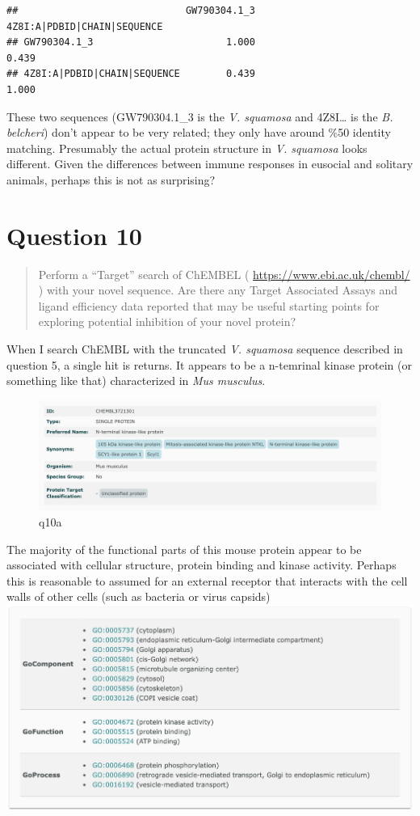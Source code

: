 \documentclass[]{article}
\begin{document}
\begin{verbatim}
##                             GW790304.1_3 4Z8I:A|PDBID|CHAIN|SEQUENCE
## GW790304.1_3                       1.000                       0.439
## 4Z8I:A|PDBID|CHAIN|SEQUENCE        0.439                       1.000
\end{verbatim}

These two sequences (GW790304.1\_3 is the \emph{V. squamosa} and
4Z8I\ldots{} is the \emph{B. belcheri}) don't appear to be very related;
they only have around \%50 identity matching. Presumably the actual
protein structure in \emph{V. squamosa} looks different. Given the
differences between immune responses in eusocial and solitary animals,
perhaps this is not as surprising?

\section{Question 10}\label{question-10}

\begin{quote}
Perform a ``Target'' search of ChEMBEL (
\url{https://www.ebi.ac.uk/chembl/} ) with your novel sequence. Are
there any Target Associated Assays and ligand efficiency data reported
that may be useful starting points for exploring potential inhibition of
your novel protein?
\end{quote}

When I search ChEMBL with the truncated \emph{V. squamosa} sequence
described in question 5, a single hit is returns. It appears to be a
n-temrinal kinase protein (or something like that) characterized in
\emph{Mus musculus}.

\begin{figure}
\centering
\includegraphics{q10a.png}
\caption{q10a}
\end{figure}

The majority of the functional parts of this mouse protein appear to be
associated with cellular structure, protein binding and kinase activity.
Perhaps this is reasonable to assumed for an external receptor that
interacts with the cell walls of other cells (such as bacteria or virus
capsids) \includegraphics{q10b.png}
\end{document}
